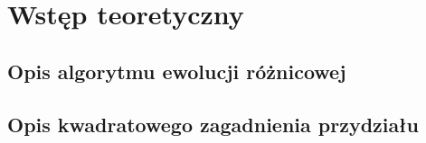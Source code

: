 \chapter{Wstęp teoretyczny}\label{cha:pierwszyDokument}


\section{Opis algorytmu ewolucji różnicowej}\label{sec:strukturaDokumentu}




\section{Opis kwadratowego zagadnienia przydziału}\label{sec:strukturaDokumentu}


